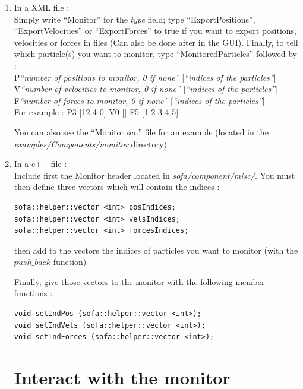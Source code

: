 \documentclass[a4paper,10pt]{article}
\begin{document}
\begin{enumerate}
	\item In a XML file :\\
	Simply write ``Monitor'' for the \textit{type} field; type ``ExportPositions'', ``ExportVelocities'' or ``ExportForces''
	to true if you want to export positions, velocities or forces in files (Can also be done after in the GUI).
	Finally, to tell which particle(s) you want to monitor, type ``MonitoredParticles'' followed by :\\

	P\textit{``number of positions to monitor, 0 if none''} [\textit{``indices of the particles''}] \\
	V\textit{``number of velocities to monitor, 0 if none''} [\textit{``indices of the particles''}] \\
	F\textit{``number of forces to monitor, 0 if none''} [\textit{``indices of the particles''}] \\

	For example :
	P3 [12 4 0] V0 [] F5 [1 2 3 4 5]

	You can also see the ``Monitor.scn'' file for an example (located in the \textit{examples/Components/monitor} directory)

	\item In a c++ file :\\
	Include first the Monitor header located in \textit{sofa/component/misc/}.
	You must then define three vectors which will contain the indices :

\begin{lstlisting}
sofa::helper::vector <int> posIndices;
sofa::helper::vector <int> velsIndices;
sofa::helper::vector <int> forcesIndices;
\end{lstlisting}

	then add to the vectors the indices of particles you want to monitor (with the $push\_back$ function)

	Finally, give those vectors to the monitor with the following member functions :

\begin{lstlisting}
void setIndPos (sofa::helper::vector <int>);
void setIndVels (sofa::helper::vector <int>);
void setIndForces (sofa::helper::vector <int>);
\end{lstlisting}

\section{Interact with the monitor}


\end{enumerate}
\end{document}
